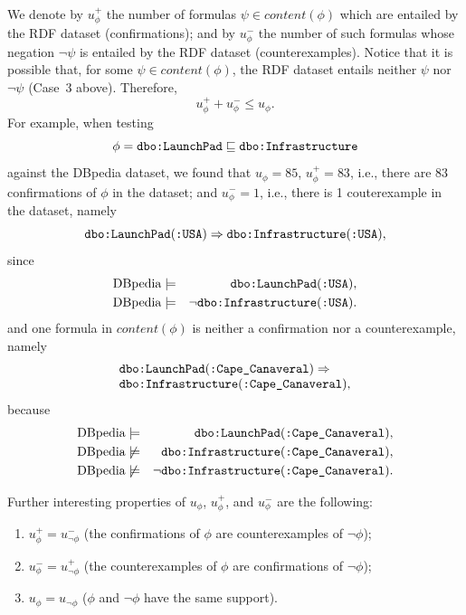 \documentclass{sig-alternate}
\begin{document}
We denote by $u_\phi^+$ the number of formulas $\psi \in content(\phi)$
which are entailed by the RDF dataset (confirmations);
and by $u_\phi^-$ the number of such formulas
whose negation $\neg\psi$ is entailed by the RDF dataset (counterexamples).
Notice that it is possible that, for some $\psi \in content(\phi)$,
the RDF dataset entails neither $\psi$ nor $\neg\psi$ (Case~3 above). Therefore,
\begin{equation}
  u_\phi^+ + u_\phi^- \leq u_\phi.\label{eq:conf-pls-expt-lt-refc}
\end{equation}
For example, when testing
\[
  \phi = \mbox{\tt dbo:LaunchPad} \sqsubseteq \mbox{\tt dbo:Infrastructure}
\]
against the DBpedia dataset, we found that $u_\phi = 85$,
$u_\phi^+ = 83$, i.e., there are 83 confirmations of $\phi$ in the dataset; 
and $u_\phi^- = 1$, i.e., there is 1 couterexample in the dataset, namely
\[
  \mbox{\tt dbo:LaunchPad}(\mbox{\tt :USA}) \Rightarrow
  \mbox{\tt dbo:Infrastructure}(\mbox{\tt :USA}),
\]
since
\begin{eqnarray*}
  \mbox{DBpedia} &\models& \mbox{\tt dbo:LaunchPad}(\mbox{\tt :USA}),\\
  \mbox{DBpedia} &\models& \neg\mbox{\tt dbo:Infrastructure}(\mbox{\tt :USA}).
\end{eqnarray*}
and one formula in $content(\phi)$ is neither a confirmation nor a counterexample, namely
\[
  \begin{array}{l}
    \mbox{\tt dbo:LaunchPad}(\mbox{\tt :Cape\_Canaveral}) \Rightarrow\\
    \mbox{\tt dbo:Infrastructure}(\mbox{\tt :Cape\_Canaveral}),
  \end{array}
\]
because
\begin{eqnarray*}
  \mbox{DBpedia} &\models& \mbox{\tt dbo:LaunchPad}(\mbox{\tt :Cape\_Canaveral}),\\
  \mbox{DBpedia} &\not\models& \mbox{\tt dbo:Infrastructure}(\mbox{\tt :Cape\_Canaveral}),\\
  \mbox{DBpedia} &\not\models& \neg\mbox{\tt dbo:Infrastructure}(\mbox{\tt :Cape\_Canaveral}).
\end{eqnarray*}


Further interesting properties of $u_\phi$, $u^+_\phi$, and $u^-_\phi$ are the following:
\begin{enumerate}
\item $u_\phi^+ = u_{\neg\phi}^-$ (the confirmations of $\phi$ are counterexamples of $\neg\phi$);
\item $u_\phi^- = u_{\neg\phi}^+$ (the counterexamples of $\phi$ are confirmations of $\neg\phi$);
\item $u_\phi = u_{\neg\phi}$ ($\phi$ and $\neg\phi$ have the same support).
\end{enumerate}
\end{document}
